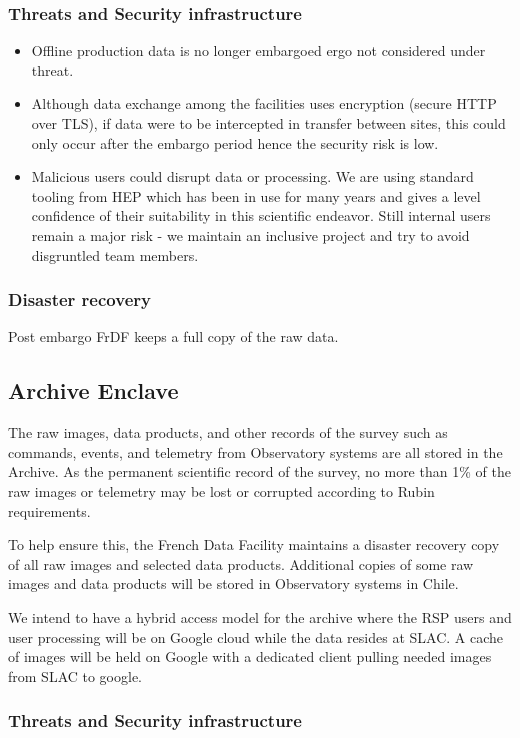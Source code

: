 \subsubsection{ Threats and Security infrastructure}
\begin{itemize}
\item Offline production data is no longer embargoed ergo not considered under threat.
\item Although data exchange among the facilities uses encryption (secure HTTP over TLS), if data were to be intercepted in transfer between sites, this could only occur after the embargo period hence the security risk is low.
\item Malicious users could disrupt data or processing.
We are using standard tooling from \gls{HEP} which has been in use for many years and gives a level confidence of their suitability in this scientific endeavor.
Still internal users remain a major risk - we maintain an inclusive project and try to avoid disgruntled team members.
\end{itemize}
\subsubsection{Disaster recovery}
Post embargo FrDF keeps a full copy of the raw data.

\subsection{ \gls{Archive}  Enclave}
The raw images, data products, and other records of the survey such as commands, events, and telemetry from Observatory systems are all stored in the \gls{Archive}.
As the permanent scientific record of the survey, no more than 1\% of the raw images or telemetry may be lost or corrupted according to Rubin requirements.

To help ensure this, the French Data Facility maintains a disaster recovery copy of all raw images and selected data products. Additional copies of some raw images and data products will be stored in Observatory systems in Chile.

We intend to have a hybrid access model for the archive where  the \gls{RSP} users and user processing will be on Google cloud while the data resides at SLAC. A cache of images will be held on Google with a dedicated client pulling needed images from SLAC to google.


\subsubsection{ Threats and Security infrastructure}

